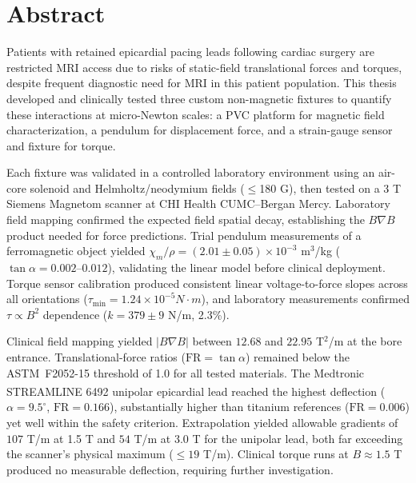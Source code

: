 \chapter*{Abstract}



Patients with retained epicardial pacing leads following cardiac surgery are restricted MRI access due to risks of static-field translational forces and torques, despite frequent diagnostic need for MRI in this patient population. This thesis developed and clinically tested three custom non-magnetic fixtures to quantify these interactions at micro-Newton scales: a PVC platform for magnetic field characterization, a pendulum for displacement force, and a strain-gauge sensor and fixture for torque.

Each fixture was validated in a controlled laboratory environment using an air-core solenoid and Helmholtz/neodymium fields ($\leq$180 G), then tested on a 3 T Siemens Magnetom\texttrademark{} scanner at CHI Health CUMC--Bergan Mercy. Laboratory field mapping confirmed the expected field spatial decay, establishing the $B\nabla B$ product needed for force predictions. Trial pendulum measurements of a ferromagnetic object yielded $\chi_m/\rho = (2.01 \pm 0.05)\times10^{-3}$ m$^3$/kg ($\tan\alpha = 0.002$--$0.012$), validating the linear model before clinical deployment. Torque sensor calibration produced consistent linear voltage-to-force slopes across all orientations ($\tau_{\min} = 1.24\times10^{-5} N \cdot m$), and laboratory measurements confirmed $\tau \propto B^{2}$ dependence ($k = 379 \pm 9$ N/m, 2.3\%).

Clinical field mapping yielded $|B\nabla B|$ between $12.68$ and $22.95$ T$^2$/m at the bore entrance. Translational-force ratios ($\mathrm{FR} = \tan\alpha$) remained below the ASTM~F2052-15 threshold of 1.0 for all tested materials. The Medtronic STREAMLINE\textsuperscript{\texttrademark} 6492 unipolar epicardial lead reached the highest deflection ($\alpha = 9.5^{\circ}$, $\mathrm{FR} = 0.166$), substantially higher than titanium references ($\mathrm{FR} = 0.006$) yet well within the safety criterion.  Extrapolation yielded allowable gradients of $107$ T/m at 1.5 T and $54$ T/m at 3.0 T for the unipolar lead, both far exceeding the scanner's physical maximum ($\leq 19$ T/m). Clinical torque runs at $B \approx 1.5$ T produced no measurable deflection, requiring further investigation.

